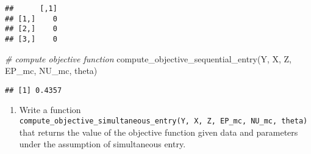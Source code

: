 \documentclass[
]{article}
\newenvironment{Shaded}{\begin{snugshade}}{\end{snugshade}}
\newcommand{\CommentTok}[1]{\textcolor[rgb]{0.56,0.35,0.01}{\textit{#1}}}
\newcommand{\FunctionTok}[1]{\textcolor[rgb]{0.00,0.00,0.00}{#1}}
\newcommand{\NormalTok}[1]{#1}
\providecommand{\tightlist}{%
  \setlength{\itemsep}{0pt}\setlength{\parskip}{0pt}}
\begin{document}
\begin{verbatim}
##      [,1]
## [1,]    0
## [2,]    0
## [3,]    0
\end{verbatim}

\begin{Shaded}
\begin{Highlighting}[]
\CommentTok{\# compute objective function}
\FunctionTok{compute\_objective\_sequential\_entry}\NormalTok{(Y, X, Z, EP\_mc, NU\_mc, theta)}
\end{Highlighting}
\end{Shaded}

\begin{verbatim}
## [1] 0.4357
\end{verbatim}

\begin{enumerate}
\def\labelenumi{\arabic{enumi}.}
\setcounter{enumi}{2}
\tightlist
\item
  Write a function
  \texttt{compute\_objective\_simultaneous\_entry(Y,\ X,\ Z,\ EP\_mc,\ NU\_mc,\ theta)}
  that returns the value of the objective function given data and
  parameters under the assumption of simultaneous entry.
\end{enumerate}
\end{document}
